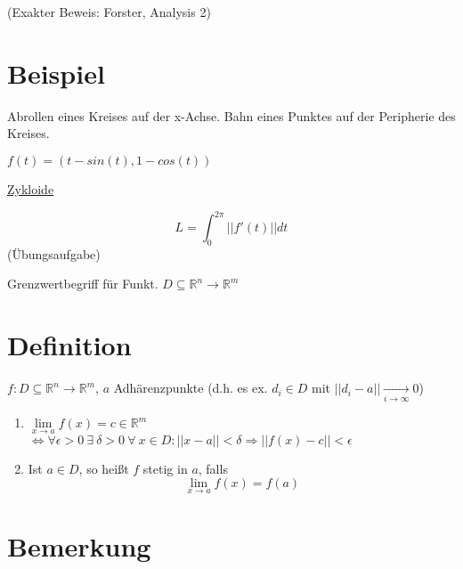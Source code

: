 \documentclass[a4paper, openany]{book}
\begin{document}
        \par \medskip

        (Exakter Beweis: Forster, Analysis 2)

        \section{Beispiel}

        Abrollen eines Kreises auf der x-Achse. Bahn eines Punktes auf der Peripherie des Kreises.

        \par \medskip

        $f(t) = (t-sin(t), 1-cos(t))$

        \par \medskip

        \underline{Zykloide}

        \par \medskip

        \[ L = \int_0^{2 \pi} ||f'(t)|| dt \] (Übungsaufgabe)

        \par \medskip

        Grenzwertbegriff für Funkt. $D \subseteq \mathbb{R}^n \rightarrow \mathbb{R}^m$

        \section{Definition}

        $f: D \subseteq \mathbb{R}^n \rightarrow \mathbb{R}^m$, $a$ Adhärenzpunkte (d.h. es ex. $d_i \in D$ mit $||d_i-a|| \underset{i \rightarrow \infty}{\longrightarrow} 0$)

        \begin{enumerate}[label=(\alph*)]
          \item $\lim \limits_{x \rightarrow a} f(x) = c \in \mathbb{R}^m$ $\Leftrightarrow \forall \epsilon > 0 \ \exists \ \delta > 0 \ \forall \ x \in D: ||x-a|| < \delta \Rightarrow ||f(x)-c|| < \epsilon$

          \item Ist $a \in D$, so heißt $f$ stetig in $a$, falls \[ \lim_{x \rightarrow a} f(x) = f(a) \]
        \end{enumerate}


         \section{Bemerkung}
\end{document}

